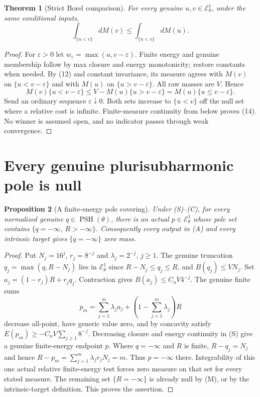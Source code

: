 \documentclass[11pt]{article}
\newtheorem{theorem}{Theorem}
\newtheorem{proposition}[theorem]{Proposition}
\newcommand{\EE}{\mathcal E^1_\theta}
\begin{document}
\begin{theorem}[Strict Borel comparison]
For every genuine $u,v\in\EE$, under the same conditional inputs,
\[
 \int_{\{u<v\}}dM(v)\leq\int_{\{u<v\}}dM(u).             \tag{14}
\]
\end{theorem}
\begin{proof}
For $\varepsilon>0$ let $w_\varepsilon=\max(u,v-\varepsilon)$.
Finite energy and genuine membership follow by max closure and
energy monotonicity; restore constants when needed.
By (12) and constant invariance, its measure agrees with $M(v)$
on $\{u<v-\varepsilon\}$ and with $M(u)$ on
$\{u>v-\varepsilon\}$. All raw masses are $V$. Hence
\[
 M(v)\{u<v-\varepsilon\}
 \leq V-M(u)\{u>v-\varepsilon\}
 =M(u)\{u\leq v-\varepsilon\}.
\]
Send an ordinary sequence $\varepsilon\downarrow0$.
Both sets increase to $\{u<v\}$ off the null set where a relative
cost is infinite. Finite-measure continuity from below proves (14).
No winner is assumed open, and no indicator passes through weak convergence.
\end{proof}

\section{Every genuine plurisubharmonic pole is null}
\begin{proposition}[A finite-energy pole covering]\label{polar}
Under (S)--(C), for every normalized genuine $q\in\operatorname{PSH}(\theta)$,
there is an actual $p\in\EE$ whose pole set contains
$\{q=-\infty,\ R>-\infty\}$.
Consequently every output in (A) and every intrinsic target gives
$\{q=-\infty\}$ zero mass.
\end{proposition}
\begin{proof}
Put $N_j=16^j$, $r_j=8^{-j}$ and $\lambda_j=2^{-j}$, $j\geq1$.
The genuine truncation $q_j=\max(q,R-N_j)$ lies in $\EE$ since
$R-N_j\leq q_j\leq R$, and $B(q_j)\leq VN_j$.
Set $a_j=(1-r_j)R+r_jq_j$.
Contraction gives $B(a_j)\leq C_nV4^{-j}$.
The genuine finite sums
\[
 p_m=\sum_{j=1}^m\lambda_j a_j
           +\left(1-\sum_{j=1}^m\lambda_j\right)R
\]
decrease all-point, have generic value zero, and by concavity satisfy
$E(p_m)\geq-C_nV\sum_{j\geq1}8^{-j}$.
Decreasing closure and energy continuity in (S) give a genuine
finite-energy endpoint $p$.
Where $q=-\infty$ and $R$ is finite, $R-q_j=N_j$ and hence
$R-p_m=\sum_{j=1}^m\lambda_j r_jN_j=m$.
Thus $p=-\infty$ there.
Integrability of this one actual relative finite-energy test forces
zero measure on that set for every stated measure.
The remaining set $\{R=-\infty\}$ is already null by (M), or by
the intrinsic-target definition. This proves the assertion.
\end{proof}
\end{document}
